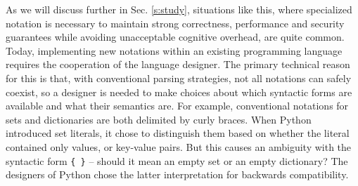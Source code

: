 %
As we will discuss further in Sec. \ref{s:study}, situations like this, where specialized notation is  necessary to maintain strong correctness, performance and security guarantees while avoiding unacceptable cognitive overhead, are quite common. 
Today, implementing new notations within an existing programming language requires the cooperation of the language designer. The primary technical reason for this is that, with conventional parsing strategies, not all notations can safely coexist, so a designer is needed to make choices about which syntactic forms are available and what their semantics are. For example, conventional notations for sets and dictionaries are both delimited by curly braces. When Python introduced set literals, it chose to distinguish them based on whether the literal contained only values, or key-value pairs. But this causes an ambiguity with the syntactic form \verb|{ }| -- should it mean an empty set or an empty dictionary? The designers of Python chose the latter interpretation for backwards compatibility.

